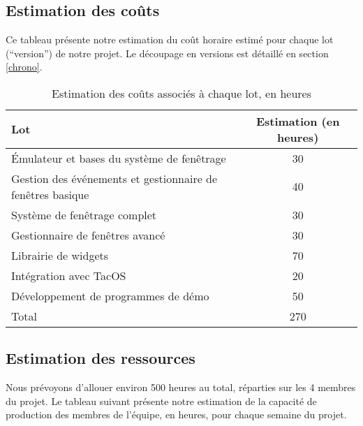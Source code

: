 \subsection{Estimation des coûts}

Ce tableau présente notre estimation du coût horaire estimé pour chaque lot (``version'') de notre projet. Le découpage en versions est détaillé en section \ref{chrono}.

\begin{table}[h]
\centering
\begin{tabular}{|l|c|}
  \hline
  \rowcolor{dark_grey} Lot & Estimation (en heures) \\
  \hline
  Émulateur et bases du système de fenêtrage & 30 \\
  \hline
  Gestion des événements et gestionnaire de fenêtres basique & 40 \\
  \hline
  Système de fenêtrage complet & 30 \\
  \hline
  Gestionnaire de fenêtres avancé & 30 \\
  \hline
  Librairie de widgets  & 70 \\
  \hline
  Intégration avec TacOS & 20 \\
  \hline
  Développement de programmes de démo & 50 \\
  \hline
  \rowcolor{dark_grey} Total & 270 \\
  \hline
\end{tabular}
\caption{Estimation des coûts associés à chaque lot, en heures}
\end{table}

\subsection{Estimation des ressources}

Nous prévoyons d'allouer environ 500 heures au total, réparties sur les 4 membres du projet. Le tableau suivant présente notre estimation de la capacité de production des membres de l'équipe, en heures, pour chaque semaine du projet.


